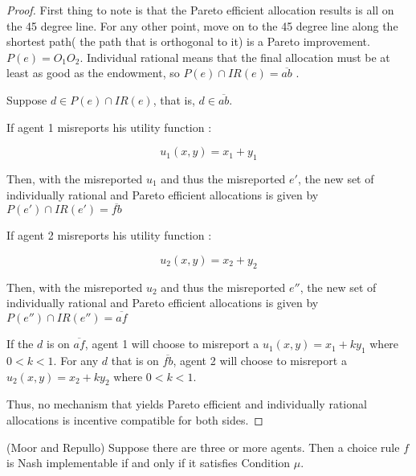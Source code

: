 \begin{proof}
First thing to note is that the Pareto efficient allocation results is
all 
on the 45 degree line. For any other point, move on to the 45 degree
line along the shortest path( the path that is orthogonal to it) is a
Pareto improvement. $P(e)=O_1O_2$.  
Individual rational means that the final allocation must be at least
as good as the endowment, so $P(e) \cap IR(e) = \overline{ab}$ .

Suppose $d \in P(e) \cap IR(e)$, that is, $d \in \overline{ab}$.

If agent 1 misreports his utility function :

$$ u_1(x,y)=x_1 + y_1$$

Then, with the misreported $u_1$ and thus the misreported $e'$, the new set of individually rational and Pareto efficient allocations is given
by $P(e') \cap IR(e') = \overline{fb}$


If agent 2 misreports his utility function :

$$ u_2(x,y)=x_2 + y_2$$

Then, with the misreported $u_2$ and thus the misreported $e''$, the new set of individually rational and Pareto efficient allocations is given
by $P(e'') \cap IR(e'') = \overline{af}$

 If the $d$ is on $\overline{af}$, agent 1 will choose to
misreport a $u_1(x,y)=x_1 + ky_1$ where $0<k<1$. For any $d$ that is on $\overline{fb}$, agent 2 will choose to
misreport a $u_2(x,y)=x_2 + ky_2$ where $0<k<1$. 

Thus, no mechanism that yields Pareto efficient and individually rational allocations is
incentive compatible for both sides.


\end{proof}


\begin{thm*}(Moor and Repullo)
\label{mu}
  Suppose there are three or more agents. Then a choice rule $f$ is Nash implementable if and only if it satisfies Condition $\mu$.
\end{thm*}

